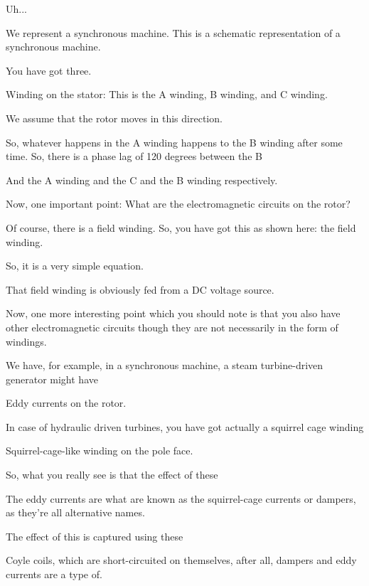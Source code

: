 \documentclass{article}
\begin{document}
Uh...

We represent a synchronous machine. This is a schematic representation of a synchronous machine.

You have got three.

Winding on the stator: This is the A winding, B winding, and C winding.

We assume that the rotor moves in this direction.

So, whatever happens in the A winding happens to the B winding after some time. So, there is a phase lag of 120 degrees between the B

And the A winding and the C and the B winding respectively.

Now, one important point: What are the electromagnetic circuits on the rotor?

Of course, there is a field winding. So, you have got this as shown here: the field winding.

So, it is a very simple equation.

That field winding is obviously fed from a DC voltage source.

Now, one more interesting point which you should note is that you also have other electromagnetic circuits though they are not necessarily in the form of windings.

We have, for example, in a synchronous machine, a steam turbine-driven generator might have

Eddy currents on the rotor.

In case of hydraulic driven turbines, you have got actually a squirrel cage winding

Squirrel-cage-like winding on the pole face.

So, what you really see is that the effect of these

The eddy currents are what are known as the squirrel-cage currents or dampers, as they're all alternative names.

The effect of this is captured using these

Coyle coils, which are short-circuited on themselves, after all, dampers and eddy currents are a type of.
\end{document}
